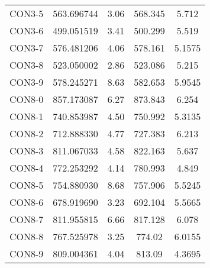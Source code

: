 \begin{table}[ht]
\begin{tabular}{c c c c c}
CON3-5 & 563.696744 & 3.06 & 568.345 & 5.712 \\
CON3-6 & 499.051519 & 3.41 & 500.299 & 5.519 \\
CON3-7 & 576.481206 & 4.06 & 578.161 & 5.1575 \\
CON3-8 & 523.050002 & 2.86 & 523.086 & 5.215 \\
CON3-9 & 578.245271 & 8.63 & 582.653 & 5.9545 \\
CON8-0 & 857.173087 & 6.27 & 873.843 & 6.254 \\
CON8-1 & 740.853987 & 4.50 & 750.992 & 5.3135 \\
CON8-2 & 712.888330 & 4.77 & 727.383 & 6.213 \\
CON8-3 & 811.067033 & 4.58 & 822.163 & 5.637 \\
CON8-4 & 772.253292 & 4.14 & 780.993 & 4.849 \\
CON8-5 & 754.880930 & 8.68 & 757.906 & 5.5245 \\
CON8-6 & 678.919690 & 3.23 & 692.104 & 5.5665 \\
CON8-7 & 811.955815 & 6.66 & 817.128 & 6.078 \\
CON8-8 & 767.525978 & 3.25 & 774.02 & 6.0155 \\
CON8-9 & 809.004361 & 4.04 & 813.09 & 4.3695 \\
[1ex]\hline
\end{tabular}
\label{table:nonlin}
\end{table} \clearpage
